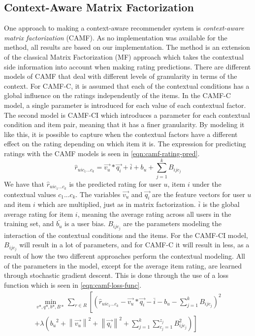 \subsection{Context-Aware Matrix Factorization}
One approach to making a context-aware recommender system is \textit{context-aware matrix factorization} (CAMF)\cite{baltrunasCAMF}.
As no implementation was available for the method, all results are based on our implementation.
The method is an extension of the classical Matrix Factorization (MF) approach which takes the contextual side information into account when making rating predictions.
There are different models of CAMF that deal with different levels of granularity in terms of the context.
For CAMF-C, it is assumed that each of the contextual conditions has a global influence on the ratings independently of the items.
In the CAMF-C model, a single parameter is introduced for each value of each contextual factor.
The second model is CAMF-CI which introduces a parameter for each contextual condition and item pair, meaning that it has a finer granularity.
By modeling it like this, it is possible to capture when the contextual factors have a different effect on the rating depending on which item it is.
The expression for predicting ratings with the CAMF models is seen in \autoref{eqn:camf-rating-pred}.
\begin{equation}
    \label{eqn:camf-rating-pred}
    \hat{r}_{uic_1...c_k} = \vec{v_u} * \vec{q_i} + \bar{i} + b_u + \sum\limits_{j = 1}^k B_{ijc_j}
\end{equation}
We have that $\hat{r}_{uic_1...c_k}$ is the predicted rating for user $u$, item $i$ under the contextual values $c_1...c_k$.
The variables $\vec{v_u} $ and $ \vec{q_i}$ are the feature vectors for user $u$ and item $i$ which are multiplied, just as in matrix factorization.
$\bar{i}$ is the global average rating for item $i$, meaning the average rating across all users in the training set, and $\bar{b_u}$ is a user bias.
$B_{ijc_j}$ are the parameters modeling the interaction of the contextual conditions and the items.
For the CAMF-CI model, $B_{ijc_j}$ will result in a lot of parameters, and for CAMF-C it will result in less, as a result of how the two different approaches perform the contextual modeling.
All of the parameters in the model, except for the average item rating, are learned through stochastic gradient descent.
This is done through the use of a loss function which is seen in \autoref{eqn:camf-loss-func}.
\begin{equation}
    \label{eqn:camf-loss-func}
    \begin{split}
        \min_{v*, q*, b*, B*}\sum \limits_{r \in  R}\left [ \left (  \hat{r}_{uic_1...c_k} - \vec{v_u} * \vec{q_i} - \bar{i} - b_u - \sum\limits_{j = 1}^k B_{ijc_j}\right )^2 \right. \\
        \left. + \lambda \left({b_u}^2 +{\left \| \vec{v_u} \right \|}^2  + {\left \|\vec{q_i}  \right \|}^2 + \sum\limits_{j = 1}^k \sum\limits_{c_j = 1}^{z_j} B_{ijc_j}^{2}\right ) \right ]
    \end{split}
\end{equation}
